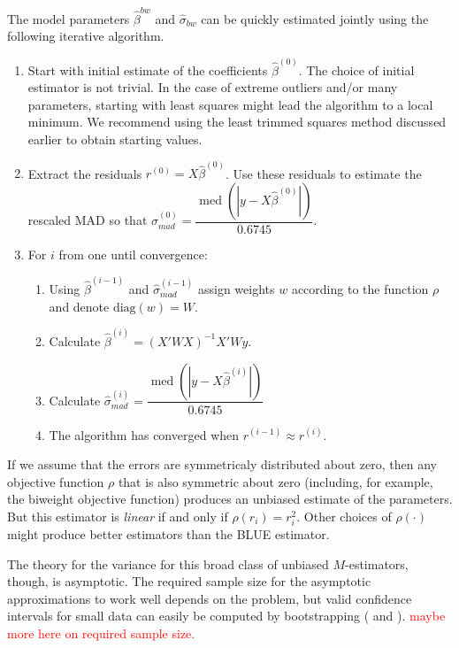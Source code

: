 \documentclass[12pt]{article}
\DeclareMathOperator{\med}{med}
\newcommand{\ctk}[1]{\textcolor{red}{#1}}
\begin{document}
The model parameters $\hat{\beta}^{bw}$ and $\hat{\sigma}_{bw}$ can be quickly estimated jointly using the following iterative algorithm.
\begin{enumerate}
\item Start with initial estimate of the coefficients $\hat{\beta}^{(0)}$. The choice of initial estimator is not trivial. 
In the case of extreme outliers and/or many parameters, starting with least squares might lead the algorithm to a local minimum. 
We recommend using the least trimmed squares method discussed earlier to obtain starting values.
\item Extract the residuals $r^{(0)} = X\hat{\beta}^{(0)}$. 
Use these residuals to estimate the rescaled MAD so that $\hat{\sigma}^{(0)}_{mad} = \dfrac{\med\left( |y - X\hat{\beta}^{(0)}|\right)}{0.6745}$.
\item For $i$ from one until convergence:
        \begin{enumerate}
        \item Using $\hat{\beta}^{(i-1)}$ and $\hat{\sigma}^{(i-1)}_{mad}$ assign weights $w$ according to the function $\rho$ and denote $\text{diag}(w) = W$.
        \item Calculate $\hat{\beta}^{(i)} = (X'WX)^{-1}X'Wy$.
        \item Calculate $\hat{\sigma}^{(i)}_{mad} = \dfrac{\med\left( |y - X\hat{\beta}^{(i)}|\right)}{0.6745}$
        \item The algorithm has converged when $r^{(i-1)} \approx r^{(i)}$.
        \end{enumerate}
\end{enumerate}

If we assume that the errors are symmetricaly distributed about zero, then any objective function $\rho$ that is also symmetric about zero (including, for example, the biweight objective function) produces an unbiased estimate of the parameters. 
But this estimator is \textit{linear} if and only if $\rho(r_i) = r_i^2$. Other choices of $\rho(\cdot)$ might produce better estimators than the BLUE estimator.  

The theory for the variance for this broad class of unbiased $M$-estimators, though, is asymptotic. 
The required sample size for the asymptotic approximations to work well depends on the problem, but valid confidence intervals for small data can easily be computed by bootstrapping (\citealt{Efron1981} and \citealt{MooneyDuval1993}). 
\ctk{maybe more here on required sample size.}
\end{document}
